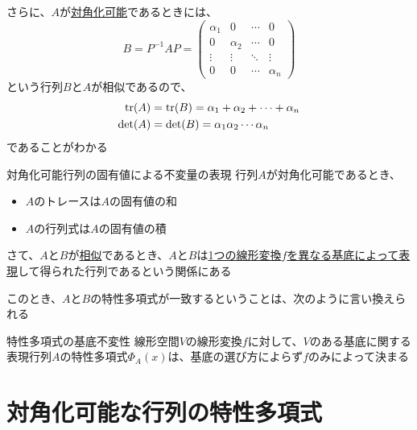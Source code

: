 \documentclass[../../../topic_linear-algebra]{subfiles}
\begin{document}
\br

さらに、$A$が\hyperref[def:diagonalizable]{対角化可能}であるときには、
\begin{equation*}
  B = P^{-1}AP = \begin{pmatrix}
    \alpha_1 & 0        & \cdots & 0        \\
    0        & \alpha_2 & \cdots & 0        \\
    \vdots   & \vdots   & \ddots & \vdots   \\
    0        & 0        & \cdots & \alpha_n
  \end{pmatrix}
\end{equation*}
という行列$B$と$A$が相似であるので、
\begin{align*}
  \tr(A)  & = \tr(B) = \alpha_1 + \alpha_2 + \cdots + \alpha_n \\
  \det(A) & = \det(B) = \alpha_1 \alpha_2 \cdots \alpha_n
\end{align*}
であることがわかる

\begin{theorem}{対角化可能行列の固有値による不変量の表現}
  行列$A$が対角化可能であるとき、
  \begin{itemize}
    \item $A$のトレースは$A$の固有値の和
    \item $A$の行列式は$A$の固有値の積
  \end{itemize}
\end{theorem}

\sectionline

さて、$A$と$B$が\hyperref[def:similar-matrices]{相似}であるとき、$A$と$B$は\hyperref[thm:similarity-under-basis-change]{1つの線形変換$f$を異なる基底によって表現}して得られた行列であるという関係にある

\br

このとき、$A$と$B$の特性多項式が一致するということは、次のように言い換えられる

\begin{theorem}{特性多項式の基底不変性}
  線形空間$V$の線形変換$f$に対して、$V$のある基底に関する表現行列$A$の特性多項式$\Phi_A(x)$は、基底の選び方によらず$f$のみによって決まる
\end{theorem}

\sectionline
\section{対角化可能な行列の特性多項式}
\end{document}
